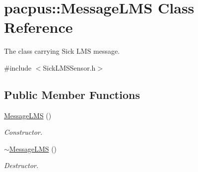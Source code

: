 \hypertarget{classpacpus_1_1MessageLMS}{\section{pacpus\-:\-:Message\-L\-M\-S Class Reference}
\label{classpacpus_1_1MessageLMS}
}


The class carrying Sick L\-M\-S message.  




{\ttfamily \#include $<$Sick\-L\-M\-S\-Sensor.\-h$>$}

\subsection*{Public Member Functions}
\begin{DoxyCompactItemize}
\item 
\hypertarget{classpacpus_1_1MessageLMS_a20ef9a5b76448142f0bf88a859c5d042}{\hyperlink{classpacpus_1_1MessageLMS_a20ef9a5b76448142f0bf88a859c5d042}{Message\-L\-M\-S} ()}\label{classpacpus_1_1MessageLMS_a20ef9a5b76448142f0bf88a859c5d042}

\begin{DoxyCompactList}\small\item\em Constructor. \end{DoxyCompactList}\item 
\hypertarget{classpacpus_1_1MessageLMS_a586746e0e35aa83419044efd92556ea4}{\hyperlink{classpacpus_1_1MessageLMS_a586746e0e35aa83419044efd92556ea4}{$\sim$\-Message\-L\-M\-S} ()}\label{classpacpus_1_1MessageLMS_a586746e0e35aa83419044efd92556ea4}

\begin{DoxyCompactList}\small\item\em Destructor. \end{DoxyCompactList}\end{DoxyCompactItemize}
